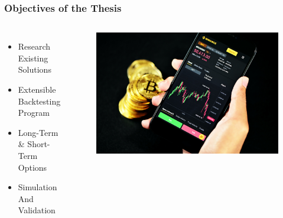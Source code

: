 




\begin{frame}
  \frametitle{Objectives of the Thesis}
  \begin{columns}
    \begin{itemize}
        \item Research Existing Solutions
        \item Extensible Backtesting Program
        \item Long-Term \& Short-Term Options
        \item Simulation And Validation
    \end{itemize}


    \begin{figure}
      \includegraphics[width=\textwidth]{img/bitcoin.jpg}
    \end{figure}
  \end{columns}
\end{frame}


